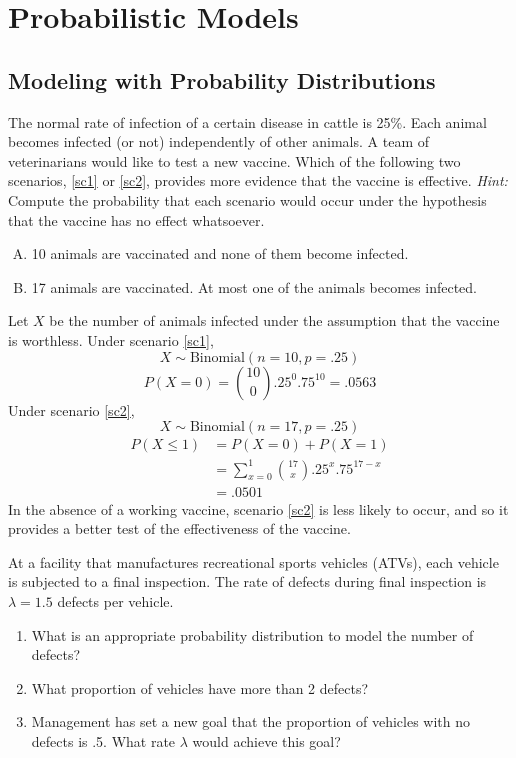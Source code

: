\chapter{Probabilistic Models}

\section{Modeling with Probability Distributions}

The normal rate of infection of a certain disease in cattle is
25\%.  Each animal becomes infected (or not) independently of other
animals.  A team of veterinarians would like to test a new
vaccine. Which of the following two scenarios, \ref{sc1} or \ref{sc2},
provides more evidence that the vaccine is effective.  \emph{Hint:}
Compute the probability that each scenario would occur under the
hypothesis that the vaccine has no effect whatsoever.
\begin{enumerate}[A)]
\item 10 animals are vaccinated and none of them become infected. \label{sc1}
\item 17 animals are vaccinated. At most one of the animals becomes infected. \label{sc2}
\end{enumerate}

Let $X$ be the number of animals infected under the assumption that
the vaccine is worthless.  Under scenario \ref{sc1},
\[ X \sim \text{Binomial}(n=10,p=.25) \]
\[ P(X = 0) = {10 \choose 0} .25^0 .75^{10} = .0563 \]
Under scenario \ref{sc2}, 
\[ X \sim \text{Binomial}(n=17,p=.25) \]
\begin{align*} P(X \leq 1) &= P(X=0) + P(X=1) \\
                 &= \sum_{x=0}^1 {17 \choose x} .25^x .75^{17-x} \\
                 &= .0501
\end{align*}
In the absence of a working vaccine, scenario \ref{sc2} is less likely to occur,
and so it provides a better test of the effectiveness of the vaccine.


At a facility that manufactures recreational sports
  vehicles (ATVs), each vehicle is subjected to a final
  inspection. The rate of defects during final inspection is
  $\lambda=1.5$ defects per vehicle.
\begin{enumerate}
\item What is an appropriate probability distribution to model the
number of defects? \label{atv1}
\item What proportion of vehicles have more than 2 defects? \label{atv2}
\item Management has set a new goal that the proportion
of vehicles with no defects is .5. What rate $\lambda$ would
achieve this goal? \label{atv3}
\end{enumerate}

